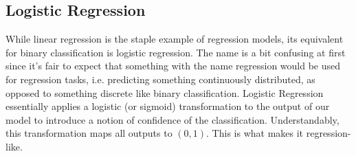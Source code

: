 \documentclass[11pt]{article}
\begin{document}
\subsection{Logistic Regression}

While linear regression is the staple example of regression models, its equivalent for binary classification is logistic regression. The name is a bit confusing at first since it's fair to expect that something with the name regression would be used for regression tasks, i.e. predicting something continuously distributed, as opposed to something discrete like binary classification. Logistic Regression essentially applies a logistic (or sigmoid) transformation to the output of our model to introduce a notion of confidence of the classification. Understandably, this transformation maps all outputs to $(0,1)$. This is what makes it regression-like.
\end{document}
